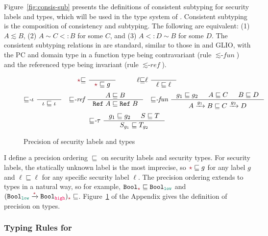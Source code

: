 Figure~\ref{fig:consis-sub} presents the definitions of consistent subtyping for
security labels and types, which will be used in the type system of \Surface.
Consistent subtyping is the composition of consistency and subtyping. The
following are equivalent: (1) $A \lesssim B$, (2) $A \sim C <: B$ for some $C$,
and (3) $A <: D \sim B$ for some $D$. The consistent subtyping relations in
\Surface are standard, similar to those in \GSLRef and GLIO, with the PC and
domain type in a function type being contravariant (rule
${\lesssim}\textit{-fun}$) and the referenced type being invariant
(rule ${\lesssim}\textit{-ref}$).

\begin{figure}[tbp]
  \raggedright
  \begin{gather*}
    \unk{\sqsubseteq}~
    \inference{}{\unk \sqsubseteq g}
    \qquad\quad
    \ell{\sqsubseteq}\ell~
    \inference{}{\ell \sqsubseteq \ell}
  \end{gather*}
  \begin{gather*}
    {\sqsubseteq}\textit{-}\iota~
    \inference{}{\iota \sqsubseteq \iota}
    \quad
        {\sqsubseteq}\textit{-ref}~
        \inference{A \sqsubseteq B}{\Refer{A} \sqsubseteq \Refer{B}}
        \quad
            {\sqsubseteq}\textit{-fun}~
            \inference{g_1 \sqsubseteq g_2 &
              A \sqsubseteq C &
              B \sqsubseteq D}
                      {\Fun{A}{g_1}{B} \sqsubseteq \Fun{C}{g_2}{D}}
  \end{gather*}
  \begin{gather*}
    {\sqsubseteq}\textit{-}\tau~
    \inference{g_1 \sqsubseteq g_2 & S \sqsubseteq T}{S_{g_1} \sqsubseteq T_{g_2}}
  \end{gather*}
  \caption{Precision of security labels and types}
  \label{fig:type-prec}
\end{figure}

I define a precision ordering $\sqsubseteq$ on security labels and security
types. For security labels, the statically unknown label \unk is the most
imprecise, so $\unk \sqsubseteq g$ for any label $g$ and $\ell \sqsubseteq \ell$
for any specific security label $\ell$. The precision ordering extends to types
in a natural way, so for example, $\Bool_{\unk} \sqsubseteq \Bool_{\low}$ and
$(\Fun{\Bool_{\low}}{\unk}{\Bool_{\high}})_{\unk} \sqsubseteq $.
Figure~\ref{fig:type-prec} of the Appendix gives the definition of precision on
types.

\subsubsection{Typing Rules for \Surface}
\label{sec:surface-typing-rules}

